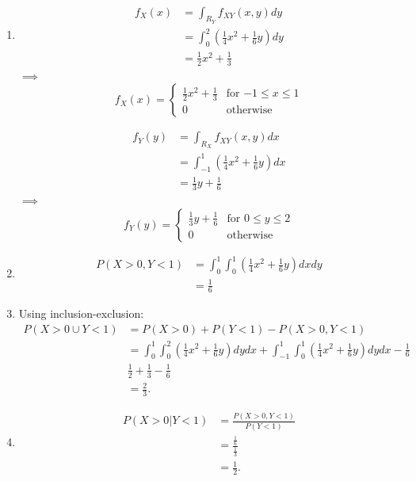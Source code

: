 \begin{problem}{18} $ $
\begin{enumerate}


\item
\begin{align*}
f_X(x) &= \int_{R_Y} f_{XY}(x, y)dy \\
&= \int_{0}^2 \left(\frac{1}{4}x^2+\frac{1}{6}y \right )dy \\
& = \frac{1}{2}x^2+\frac{1}{3}
\end{align*}
$\implies$
\[
  f_X(x) =
  \begin{cases}
                                    \frac{1}{2}x^2+\frac{1}{3}& \text{for $-1 \le x\le 1$} \\
                                   0& \text{otherwise}
   \end{cases}
\]


\begin{align*}
f_Y(y) &= \int_{R_X} f_{XY}(x, y)dx \\
&= \int_{-1}^1 \left(\frac{1}{4}x^2+\frac{1}{6}y \right )dx \\
& = \frac{1}{3}y+\frac{1}{6}
\end{align*}
$\implies$
\[
  f_Y(y) =
  \begin{cases}
                                    \frac{1}{3}y+\frac{1}{6}& \text{for $0 \le y\le 2$} \\
                                   0& \text{otherwise}
   \end{cases}
\]

\item
\begin{align*}
P(X>0, Y<1) &= \int_{0}^1 \int_0^1\left( \frac{1}{4}x^2+\frac{1}{6}y \right)dxdy \\
&= \frac{1}{6}
\end{align*}

\item Using inclusion-exclusion:
\begin{align*}
P(X>0 \cup Y<1) &= P(X>0)+P(Y<1)-P(X>0, Y<1)\\
& = \int_{0}^1 \int_0^2\left( \frac{1}{4}x^2+\frac{1}{6}y \right)dydx +\int_{-1}^1 \int_0^1\left( \frac{1}{4}x^2+\frac{1}{6}y \right)dydx -\frac{1}{6} \\
&\frac{1}{2}+\frac{1}{3} -\frac{1}{6} \\
&= \frac{2}{3}.
\end{align*}

\item
\begin{align*}
P(X>0|Y<1) &= \frac{P(X>0, Y<1)}{P(Y<1)}\\
& = \frac{\frac{1}{6}}{\frac{1}{3}} \\
&= \frac{1}{2}.
\end{align*}


\end{enumerate}
\end{problem}
